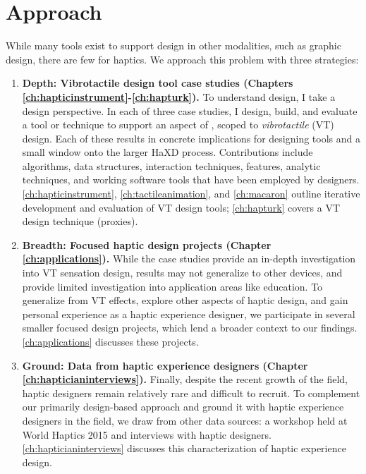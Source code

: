 \section{Approach}
While many tools exist to support design in other modalities, such as graphic design, there are few for haptics.
We approach this problem with three strategies:
\begin{enumerate}
\item \textbf{Depth: Vibrotactile design tool case studies (Chapters \ref{ch:hapticinstrument}-\ref{ch:hapturk}).}
To understand design, I take a design perspective.
In each of three case studies, I design, build, and evaluate a tool or technique to support an aspect of \haxd, scoped to \emph{vibrotactile} (VT) design.
Each of these results in concrete implications for designing tools and a small window onto the larger HaXD process.
Contributions include algorithms, data structures, interaction techniques, features, analytic techniques, and working software tools that have been employed by designers.
\autoref{ch:hapticinstrument}, \autoref{ch:tactileanimation}, and \autoref{ch:macaron} outline iterative development and evaluation of VT design tools; \autoref{ch:hapturk} covers a VT design technique (proxies).

\item \textbf{Breadth: Focused haptic design projects (Chapter \ref{ch:applications}).}
While the case studies provide an in-depth investigation into VT sensation design, results may not generalize to other devices, and provide limited investigation into application areas like education.
To generalize from VT effects, explore other aspects of haptic design, and gain personal experience as a haptic experience designer, we participate in several smaller focused design projects, which lend a broader context to our findings.
\autoref{ch:applications} discusses these projects.

\item \textbf{Ground: Data from haptic experience designers (Chapter \ref{ch:hapticianinterviews}).}
Finally, despite the recent growth of the field, haptic designers remain relatively rare and difficult to recruit.
To complement our primarily design-based approach and ground it with haptic experience designers in the field, we draw from other data sources: a workshop held at World Haptics 2015 and interviews with haptic designers.
\autoref{ch:hapticianinterviews} discusses this characterization of haptic experience design.
\end{enumerate}


